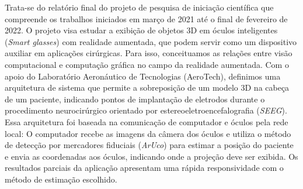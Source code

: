 \documentclass[Portugues]{projetoFAPESP}
\begin{document}

\geraTitulo

\folhaDeRosto

\begin{resumo}
  Trata-se do relatório final do projeto de pesquisa de iniciação científica que compreende os trabalhos iniciados em março de 2021 até o final de fevereiro de 2022. O projeto visa estudar a exibição de objetos 3D em óculos inteligentes (\textit{Smart glasses}) com realidade aumentada, que podem servir como um dispositivo auxiliar em aplicações cirúrgicas. Para isso, conceituamos as relações entre visão computacional e computação gráfica no campo da realidade aumentada. Com o apoio do Laboratório Aeronáutico de Tecnologias (AeroTech), definimos uma arquitetura de sistema que permite a sobreposição de um modelo 3D na cabeça de um paciente, indicando pontos de implantação de eletrodos durante o procedimento neurocirúrgico orientado por estereoeletroencefalografia (\textit{SEEG}). Essa arquitetura foi baseada na comunicação de computador e óculos pela rede local: O computador recebe as imagens da câmera dos óculos e utiliza o método de detecção por mercadores fiduciais (\textit{ArUco}) para estimar a posição do paciente e envia as coordenadas aos óculos, indicando onde a projeção deve ser exibida. Os resultados parciais da aplicação apresentam uma rápida responsividade com o método de estimação escolhido.

\end{resumo}

\clearpage
\tableofcontents
\thispagestyle{empty}
\clearpage










\printbibliography[heading=bibintoc, title={Referências bibliográficas} ]
\end{document}
